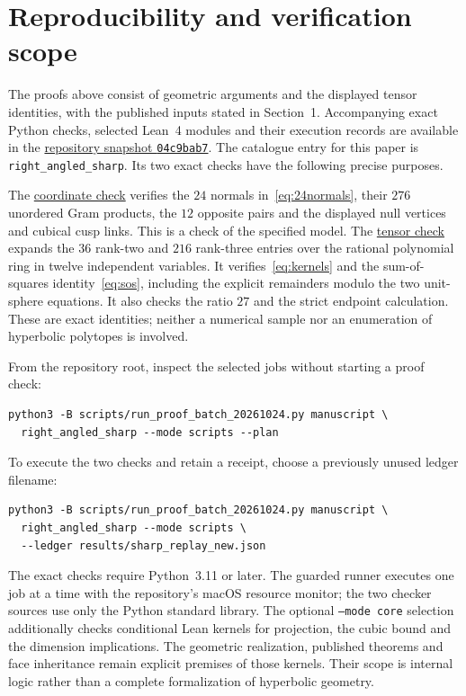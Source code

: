 \documentclass[11pt]{article}
\theoremstyle{remark}
\begin{document}
\section{Reproducibility and verification scope}\label{sec:reproduce}

The proofs above consist of geometric arguments and the displayed
tensor identities, with the published inputs stated in Section~1.
Accompanying exact Python checks, selected Lean~4 modules and their
execution records are available in the
\href{https://github.com/sashakolpakov/CoxeterPolytopes/tree/04c9bab7}{repository snapshot \texttt{04c9bab7}}.
The catalogue entry for this paper is
\texttt{right\_angled\_sharp}. Its two exact checks have the following
precise purposes.

The \href{https://github.com/sashakolpakov/CoxeterPolytopes/blob/04c9bab7/scripts/check_ideal_right_angled_dimension4_model_20261020.py}{coordinate check}
verifies the $24$ normals in~\eqref{eq:24normals},
their $276$ unordered Gram products, the $12$ opposite pairs and
the displayed null vertices and cubical cusp links. This is a check
of the specified model. The \href{https://github.com/sashakolpakov/CoxeterPolytopes/blob/04c9bab7/scripts/check_right_angled_sharp_dimension_sos_20261020.py}{tensor check}
expands the $36$ rank-two
and $216$ rank-three entries over the rational polynomial ring in
twelve independent variables. It verifies~\eqref{eq:kernels} and
the sum-of-squares identity~\eqref{eq:sos}, including the explicit
remainders modulo the two unit-sphere equations. It also checks the
ratio $27$ and the strict endpoint calculation. These are exact
identities; neither a numerical sample nor an enumeration of
hyperbolic polytopes is involved.

From the repository root, inspect the selected jobs without starting
a proof check:
\begingroup\small
\begin{verbatim}
python3 -B scripts/run_proof_batch_20261024.py manuscript \
  right_angled_sharp --mode scripts --plan
\end{verbatim}
\endgroup
To execute the two checks and retain a receipt, choose a previously
unused ledger filename:
\begingroup\small
\begin{verbatim}
python3 -B scripts/run_proof_batch_20261024.py manuscript \
  right_angled_sharp --mode scripts \
  --ledger results/sharp_replay_new.json
\end{verbatim}
\endgroup
The exact checks require Python~3.11 or later. The guarded runner
executes one job at a time with the repository's macOS resource
monitor; the two checker sources use only the Python standard library.
The optional \texttt{--mode core} selection additionally checks
conditional Lean kernels for projection, the cubic bound and the
dimension implications. The geometric realization, published
theorems and face inheritance remain explicit premises of those
kernels. Their scope is internal logic rather than a complete
formalization of hyperbolic geometry.
\end{document}
